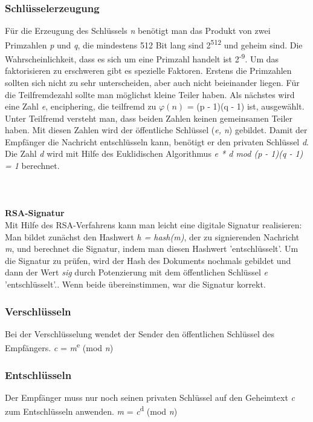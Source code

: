 \documentclass[11pt]{scrartcl}
\begin{document}
\subsubsection{Schlüsselerzeugung}
\label{sec:key-generation}
Für die Erzeugung des Schlüssels \textit{n} benötigt man das Produkt von zwei Primzahlen \textit{p} und \textit{q}, die mindestens 512 Bit lang sind 2\textsuperscript{512} und geheim sind. Die Wahrscheinlichkeit, dass es sich um eine Primzahl handelt ist 2\textsuperscript{-9}. Um das faktorisieren zu erschweren gibt es spezielle Faktoren. Erstens die Primzahlen sollten sich nicht zu sehr unterscheiden, aber auch nicht beieinander liegen. Für die Teilfremdezahl sollte man möglichst kleine Teiler haben. Als nächstes wird eine Zahl \textit{e}, enciphering, die teilfremd zu $\varphi(n)$ = (p - 1)(q - 1) ist, ausgewählt. Unter Teilfremd versteht man, dass beiden Zahlen keinen gemeinsamen Teiler haben. Mit diesen Zahlen wird der öffentliche Schlüssel (\textit{e, n}) gebildet. Damit der Empfänger die Nachricht entschlüsseln kann, benötigt er den privaten Schlüssel \textit{d}. Die Zahl \textit{d} wird mit Hilfe des Euklidischen Algorithmus \textit{e * d mod (p - 1)(q - 1) = 1} berechnet.\\\\
\noindent\\\\
\textbf{RSA-Signatur}\\
\grqq{}Mit Hilfe des RSA-Verfahrens kann man leicht eine digitale Signatur realisieren: Man bildet zunächst den Hashwert \textit{h = hash(m)}, der zu signierenden Nachricht \textit{m}, und berechnet die Signatur, indem man diesen Hashwert 'entschlüsselt'.\grqq{}\cite{1}
Um die Signatur zu prüfen, wird der Hash des Dokuments nochmals gebildet und \grqq{} dann der Wert \textit{sig} durch Potenzierung mit dem öffentlichen Schlüssel \textit{e} 'entschlüsselt'.\grqq{}\cite{1}.
Wenn beide übereinstimmen, war die Signatur korrekt. \cite{1}\cite{2}\cite{6}
\subsubsection{Verschlüsseln}
\label{sec:rsa-encrypt}
Bei der Verschlüsselung wendet der Sender den öffentlichen Schlüssel des Empfängers. \textit{c} = \textit{m}\textsuperscript{e} (mod \textit{n}) \cite{6}

\subsubsection{Entschlüsseln}
\label{sec:rsa-decrypt}
Der Empfänger muss nur noch seinen privaten Schlüssel auf den Geheimtext \textit{c} zum Entschlüsseln anwenden. \textit{m} = \textit{c}\textsuperscript{d} (mod \textit{n}) \cite{6}
\end{document}

